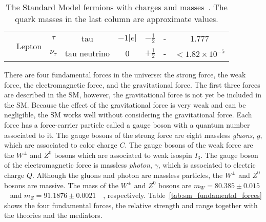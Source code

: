 \begin{table}[htp]
{\begin{tabular}{cccccccc}
                                 & \multirow{2}{*}{Lepton} & $\tau$       & tau               & $-1|e|$             & $-\frac{1}{2}$       & -                 & 1.777\\
                                 &                         & $\nu_{\tau}$ & tau neutrino      & 0                   & $+\frac{1}{2}$       & -                 & $< 1.82 \times 10^{-5}$\\
            \hline
            \hline
        \end{tabular}
    }
    \caption{The Standard Model fermions with charges and masses~\cite{Patrignani:2016xqp}.
    The quark masses in the last column are approximate values.}
    \label{tab:sm_fermions}
\end{table}%


There are four fundamental forces in the universe: the strong force, the weak force, the electromagnetic force, and the gravitational force.
The first three forces are described in the SM, however, the gravitational force is not yet be included in the SM.
Because the effect of the gravitational force is very weak and can be negligible, the SM works well without considering the gravitational force.
Each force has a force-carrier particle called a gauge boson with a quantum number associated to it.
The gauge bosons of the strong force are eight massless \textit{gluons}, $g$, which are associated to color charge $C$.
The gauge bosons of the weak force are the $W^{\pm}$ and $Z^{0}$ bosons which are associated to weak isospin $I_{3}$.
The gauge boson of the electromagnetic force is massless \textit{photon}, $\gamma$, which is associated to electric charge $Q$.
Although the gluons and photon are massless particles, the $W^{\pm}$ and $Z^{0}$ bosons are massive.
The mass of the $W^{\pm}$ and $Z^{0}$ bosons are $m_{W}=80.385 \pm 0.015$~{\GeV} and $m_{Z}=91.1876 \pm 0.0021$~{\GeV}~\cite{Patrignani:2016xqp}, respectively.
Table~\ref{tab:sm_fundamental_forces} shows the four fundamental forces, the relative strength and range together with the theories and the mediators.

